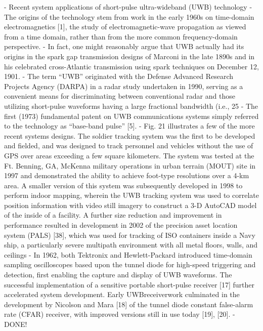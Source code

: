 \cite{fontana2004recent}
	- Recent system applications of short-pulse ultra-wideband (UWB) technology
	- The origins of the technology stem from work in the early 1960s on time-domain electromagnetics [1], the study of electromagnetic-wave propagation as viewed from a time domain, rather than from the more common frequency-domain perspective.
	- In fact, one might reasonably argue that UWB actually had its origins in the spark gap transmission designs of Marconi in the late 1890s and in his celebrated cross-Atlantic transmission using spark techniques on December 12, 1901.
	- The term “UWB” originated with the Defense Advanced Research Projects Agency (DARPA) in a radar study undertaken in 1990, serving as a convenient means for discriminating between conventional radar and those utilizing short-pulse waveforms having a large fractional bandwidth (i.e., 25%
	- The first (1973) fundamental patent on UWB communications systems simply referred to the technology as “base-band pulse” [5].
	- Fig. 21 illustrates a few of the more recent systems designs. The soldier tracking system was the first to be developed and fielded, and was designed to track personnel and vehicles without the use of GPS over areas exceeding a few square kilometers. The system was tested at the Ft. Benning, GA, McKenna military operations in urban terrain (MOUT) site in 1997 and demonstrated the ability to achieve foot-type resolutions over a 4-km area. A smaller version of this system was subsequently developed in 1998 to perform indoor mapping, wherein the UWB tracking system was used to correlate position information with video still imagery to construct a 3-D AutoCAD model of the inside of a facility. A further size reduction and improvement in performance resulted in development in 2002 of the precision asset location system (PALS) [38], which was used for tracking of ISO containers inside a Navy ship, a particularly severe multipath environment with all metal floors, walls, and ceilings
		- In 1962, both Tektronix and Hewlett-Packard introduced time-domain sampling oscilloscopes based upon the tunnel diode for high-speed triggering and detection, first enabling the capture and display of UWB waveforms. The successful implementation of a sensitive portable short-pulse receiver [17] further accelerated system development. Early UWBreceiverwork culminated in the development by Nicolson and Mara [18] of the tunnel diode constant false-alarm rate (CFAR) receiver, with improved versions still in use today [19], [20].
	- DONE!
	
